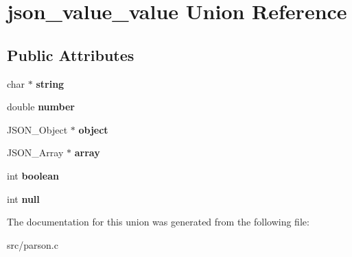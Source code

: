 \hypertarget{unionjson__value__value}{\section{json\-\_\-value\-\_\-value Union Reference}
\label{unionjson__value__value}
}
\subsection*{Public Attributes}
\begin{DoxyCompactItemize}
\item 
\hypertarget{unionjson__value__value_a21fc56f46e871b7f8dfa2ddc06d9038a}{char $\ast$ {\bfseries string}}\label{unionjson__value__value_a21fc56f46e871b7f8dfa2ddc06d9038a}

\item 
\hypertarget{unionjson__value__value_a56bf6089e42bff24cf770b4c51588408}{double {\bfseries number}}\label{unionjson__value__value_a56bf6089e42bff24cf770b4c51588408}

\item 
\hypertarget{unionjson__value__value_ae575642882ec8b1d180bb511130e5a2b}{J\-S\-O\-N\-\_\-\-Object $\ast$ {\bfseries object}}\label{unionjson__value__value_ae575642882ec8b1d180bb511130e5a2b}

\item 
\hypertarget{unionjson__value__value_aaba35eb35f79f52a8ad578c123bca7e4}{J\-S\-O\-N\-\_\-\-Array $\ast$ {\bfseries array}}\label{unionjson__value__value_aaba35eb35f79f52a8ad578c123bca7e4}

\item 
\hypertarget{unionjson__value__value_acca4e991a59beb235c6c2bd93fecdb35}{int {\bfseries boolean}}\label{unionjson__value__value_acca4e991a59beb235c6c2bd93fecdb35}

\item 
\hypertarget{unionjson__value__value_a2dc95db295e79877d9524b8df1143b16}{int {\bfseries null}}\label{unionjson__value__value_a2dc95db295e79877d9524b8df1143b16}

\end{DoxyCompactItemize}


The documentation for this union was generated from the following file\-:\begin{DoxyCompactItemize}
\item 
src/parson.\-c\end{DoxyCompactItemize}

